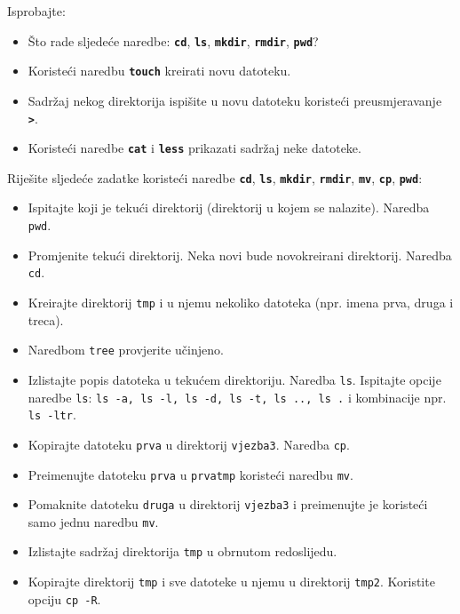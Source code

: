 \begin{zadatak}
Isprobajte:
\begin{itemize}
\item Što rade sljedeće naredbe: \textbf{\texttt{cd}}, \textbf{\texttt{ls}}, \textbf{\texttt{mkdir}}, \textbf{\texttt{rmdir}}, \textbf{\texttt{pwd}}?
\item Koristeći naredbu \textbf{\texttt{touch}} kreirati novu datoteku.
\item Sadržaj nekog direktorija ispišite u novu datoteku koristeći preusmjeravanje\textbf{ \texttt{>}}.
\item Koristeći naredbe \textbf{\texttt{cat}} i \textbf{\texttt{less}} prikazati sadržaj neke datoteke.
\end{itemize}

\end{zadatak}

\begin{zadatak} Riješite sljedeće zadatke koristeći naredbe \textbf{\texttt{cd}}, \textbf{\texttt{ls}}, \textbf{\texttt{mkdir}}, \textbf{\texttt{rmdir}}, \textbf{\texttt{mv}}, \textbf{\texttt{cp}}, \textbf{\texttt{pwd}}:
\begin{itemize}
\item Ispitajte koji je tekući direktorij (direktorij u kojem se nalazite). Naredba \texttt{pwd}.
\item Promjenite tekući direktorij. Neka novi bude novokreirani direktorij. Naredba \texttt{cd}.
\item Kreirajte direktorij \texttt{tmp} i u njemu nekoliko datoteka (npr. imena prva, druga i treca).
\item Naredbom \texttt{tree} provjerite učinjeno.
\item Izlistajte popis datoteka u tekućem direktoriju. Naredba \texttt{ls}. Ispitajte opcije naredbe \texttt{ls}: \texttt{ls -a, ls -l, ls -d, ls -t, ls .., ls .} i kombinacije npr. \texttt{ls -ltr}.
\item Kopirajte datoteku \texttt{prva} u direktorij \texttt{vjezba3}. Naredba \texttt{cp}.
\item Preimenujte datoteku \texttt{prva} u \texttt{prvatmp} koristeći naredbu \texttt{mv}.
\item Pomaknite datoteku \texttt{druga} u direktorij \texttt{vjezba3} i preimenujte je koristeći samo jednu naredbu \texttt{mv}.
\item Izlistajte sadržaj direktorija \texttt{tmp} u obrnutom redoslijedu.
\item Kopirajte direktorij \texttt{tmp} i sve datoteke u njemu u direktorij \texttt{tmp2}. Koristite opciju \texttt{cp -R}.
\end{itemize}
\end{zadatak}
